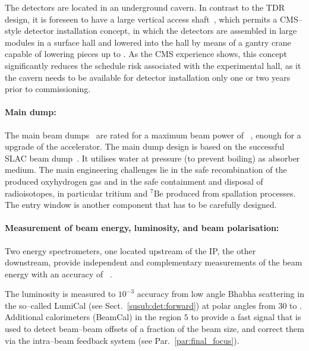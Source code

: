 The detectors are located in an underground cavern. 
In contrast to the TDR design, it is foreseen to have a large vertical access shaft~\cite{bib:cr-0003}, which permits a CMS--style detector installation concept, in which the detectors are assembled in large modules in a surface hall and lowered into the hall by means of a gantry crane capable of lowering pieces up to .
As the CMS experience shows, this concept significantly reduces the schedule risk associated with the experimental hall, as it the cavern needs to be available for detector installation only one or two years prior to commissioning.



\paragraph {Main dump:}

The main beam dumps~\cite[Sect. 8.8]{Adolphsen:2013kya} are rated for a maximum beam power of ~\cite{bib:cr-0013}, enough for a  upgrade of the accelerator.
The main dump design is based on the successful SLAC  beam dump~\cite{Walz:1967nz}.
It  utilises water at  pressure (to prevent boiling) as absorber medium. 
The main engineering challenges lie in the safe recombination of the produced oxyhydrogen gas and in the safe containment and disposal of radioisotopes, in particular tritium and $^7{\mathrm{Be}}$ produced from spallation processes.
The entry window is another component that has to be carefully designed. 


\paragraph {Measurement of beam energy, luminosity, and beam polarisation:}

Two energy spectrometers, one located  upstream of the IP, the other  downstream, provide independent and complementary measurements of the beam energy with an accuracy of ~\cite{Boogert:2009ir}.

The luminosity is measured to $10^{-3}$ accuracy from low angle Bhabha scattering in the so--called LumiCal (see Sect.~\ref{susub:det:forward}) at polar angles from $30$ to .
Additional calorimeters (BeamCal) in the region $5$ to  provide a fast signal that is used to detect beam--beam offsets of a fraction of the beam size, and correct them via the intra--beam feedback system (see Par.~\ref{par:final_focus}).


